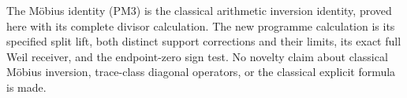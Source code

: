 \documentclass[
  10pt,
  a4paper,
]{article}
\begin{document}
The Möbius identity (PM3) is the classical arithmetic inversion
identity, proved here with its complete divisor calculation. The new
programme calculation is its specified split lift, both distinct support
corrections and their limits, its exact full Weil receiver, and the
endpoint-zero sign test. No novelty claim about classical Möbius
inversion, trace-class diagonal operators, or the classical explicit
formula is made.
\end{document}

